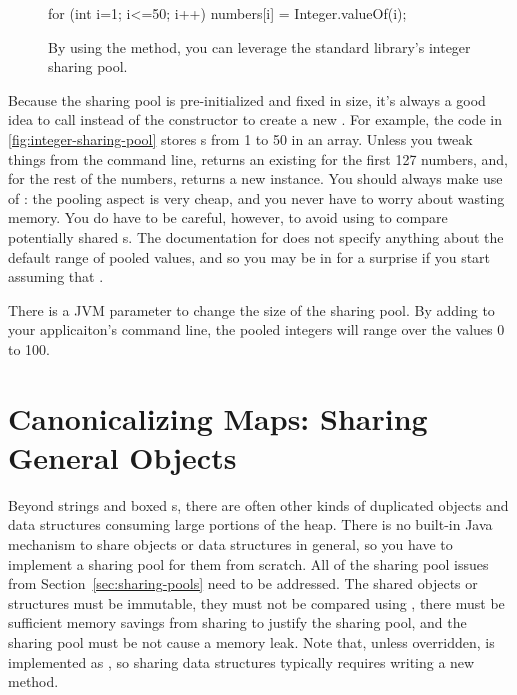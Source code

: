 \begin{figure}
\centering
\begin{framedlisting}
for (int i=1; i<=50; i++) {
 numbers[i] = Integer.valueOf(i);
}
\end{framedlisting}
\caption{By using the  method, you can leverage the standard
library's integer sharing pool.}
\label{fig:integer-sharing-pool}
\end{figure}
Because the  sharing pool is pre-initialized and fixed in size,
it's always a good idea to call  instead of the
constructor to create a new . For example, the code in
\autoref{fig:integer-sharing-pool} stores s from 1 to 50 in an
array. Unless you tweak things from the command line,
 returns an existing 
for the first 127 numbers, and, for the rest of the numbers, 
returns a new  instance. You should always make use of
: the pooling aspect is very cheap, and you never have to
worry about wasting memory. You do have to be careful, however, to avoid using
\code{==} to compare potentially shared s. The documentation for
 does not specify anything about the default range of pooled
values, and so you may be in for a surprise if you start assuming that
.

There is a JVM parameter to change the size of the  sharing pool.
By adding  to your applicaiton's command line, the
pooled integers will range over the values 0 to 100.

\section{Canonicalizing Maps: Sharing General Objects}
\label{sec:canonicalizing-maps}

Beyond strings and boxed s, there are often other kinds of
duplicated objects and data structures consuming large portions of the heap. 
There is no built-in Java mechanism to share objects or data
structures in general, so you have to implement a sharing pool for them from
scratch. All of the sharing pool issues from Section~\ref{sec:sharing-pools} need to be
addressed. The shared objects or structures must be immutable, they must not be
compared using \code{==}, there must be sufficient memory savings from sharing
to justify the sharing pool, and the sharing pool must be not cause a memory leak. 
Note that, unless overridden,  is
implemented as \code{==}, so sharing data structures typically requires writing
a new  method.

